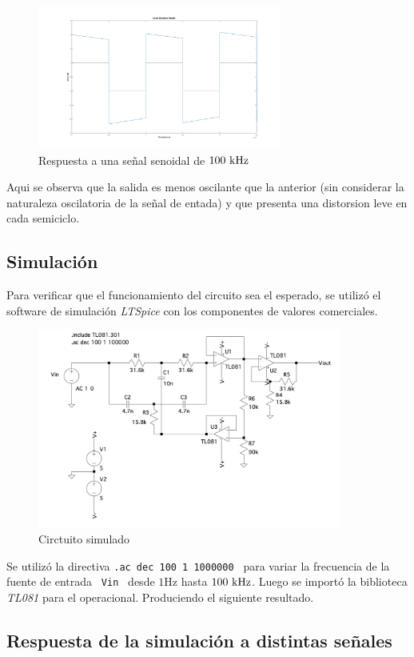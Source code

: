 \pagebreak
\begin{figure}[hbt]
	\centering
	\includegraphics[width=8cm]{imagenes/rtasqar100k}	\caption{Respuesta a una señal senoidal de $100\ \si{\kilo\hertz}$}	
\end{figure}
Aqui se observa que la salida es menos oscilante que la anterior (sin considerar la  naturaleza oscilatoria de la señal de entada)
y que presenta una distorsion leve en cada semiciclo.


\subsection*{Simulaci\'on}
	Para verificar que el funcionamiento del circuito sea el esperado, se utiliz\'o el software de simulaci\'on \textit{LTSpice} con los componentes de valores comerciales. 
\begin{figure}[hbt]
	\centering
	\includegraphics[width=10cm]{imagenes/simulacion}
	\caption{Circtuito simulado}
\end{figure}

	
Se utiliz\'o la directiva \texttt{.ac dec 100 1 1000000 } para
variar la  frecuencia de la fuente de entrada \texttt{ Vin } desde  $1 \si{\hertz}$ hasta $100 \ \si{\kilo\hertz}$. Luego se import\'o la biblioteca \textit{TL081} para el operacional. Produciendo el siguiente resultado.


\subsection*{Respuesta de la simulaci\'on a distintas señales}

